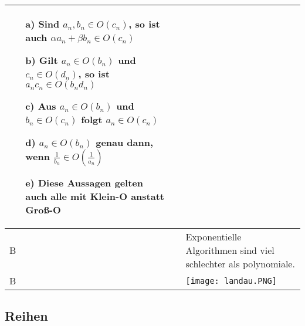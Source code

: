 \begin{longtable}{p{0.75cm} p{1cm} p{16cm}}
                            \begin{itemize}[topsep=-0.5cm]
                                \item[a)] Sind $a_n, b_n \in O(c_n)$, so ist auch $\alpha a_n + \beta b_n \in O(c_n)$
                                \item[b)] Gilt $a_n \in O(b_n)$ und $c_n \in O(d_n)$, so ist $a_n c_n \in O(b_n d_n)$
                                \item[c)] Aus $a_n \in O(b_n)$ und $b_n \in O(c_n)$ folgt $a_n \in O(c_n)$
                                \item[d)] $a_n \in O(b_n)$ genau dann, wenn $\frac{1}{b_n} \in O(\frac{1}{a_n})$
                                \item[e)] Diese Aussagen gelten auch alle mit Klein-O anstatt Gro\ss-O 
                            \end{itemize} \vspace{-0cm} \\
        \midrule
        B   &       &   Exponentielle Algorithmen sind viel schlechter als polynomiale. \\
        \midrule
        B   &       &   \texttt{[image: landau.PNG]} \\
        \bottomrule
        
    \end{longtable}

\subsection{Reihen}

